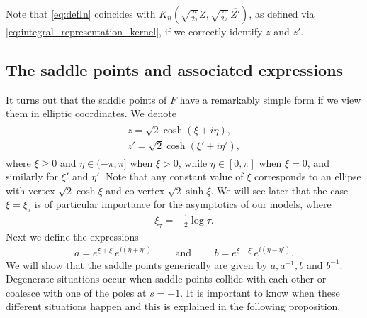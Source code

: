 \documentclass[%
 jmp,
cp,  %
 amsmath,amsthm,amssymb,%
 reprint,%
onecolumn]{revtex4-2}
\begin{document}
Note that \eqref{eq:defIn} coincides with $K_n\left(\sqrt{\frac{n}{2\tau}} Z, \sqrt{\frac{n}{2\tau}}\, \overline{Z'}\right)$, as defined via \eqref{eq:integral_representation_kernel}, if we correctly identify $z$ and $z'$. 

\subsection{The saddle points and associated expressions}

It turns out that the saddle points of $F$ have a remarkably simple form if we view them in elliptic coordinates. We denote
\begin{align} \label{eq:defEllipticCoord}
\begin{array}{l}
z = \sqrt 2 \cosh\left(\xi+i\eta\right),\\
z' = \sqrt 2 \cosh\left(\xi'+i\eta'\right),
\end{array}
\end{align}
where $\xi\geq 0$ and $\eta\in (-\pi,\pi]$ when $\xi>0$, while $\eta\in [0,\pi]$ when $\xi=0$, and similarly for $\xi'$ and $\eta'$. Note that any constant value of $\xi$ corresponds to an ellipse with vertex $\sqrt 2 \cosh \xi$ and co-vertex $\sqrt 2 \sinh \xi$. We will see later that the case $\xi=\xi_\tau$ is of particular importance for the asymptotics of our models, where
\begin{align}
\xi_\tau = -\frac{1}{2} \log \tau. 
\end{align}
Next we define the expressions 
\begin{align} \label{eq:defab}
a = e^{\xi+\xi'} e^{i(\eta+\eta')}\qquad\text{ and }\qquad 
b = e^{\xi-\xi'} e^{i(\eta-\eta')}.
\end{align}
We will show that the saddle points generically are given by $a,a^{-1},b$ and $b^{-1}$. Degenerate situations occur when saddle points collide with each other or coalesce with one of the poles at $s=\pm 1$. It  is important to know  when these different situations happen and this is explained in  the following proposition.  
\end{document}
